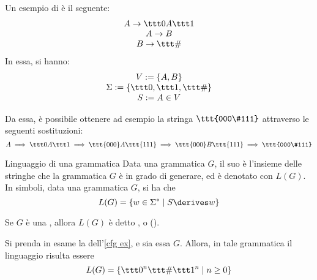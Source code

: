 \documentclass[a4paper, 12pt]{report}
\begin{document}
    \begin{example}[\CFG]
        \label{cfg ex}
        Un esempio di \CFG è il seguente: $$\left . \begin{array}{c} A \to \ttt 0 A \ttt 1 \\ A \to B \\ B \to \ttt \# \end{array} \right .$$ In essa, si hanno: $$\left . \begin{array}{c} V := \{A, B\} \\ \Sigma := \{\ttt 0, \ttt 1, \ttt \# \} \\ S := A \in V \end{array} \right. $$

        Da essa, è possibile ottenere ad esempio la stringa $\ttt{000\#111}$ attraverso le seguenti sostituzioni: $$A \implies \ttt 0 A \ttt 1 \implies \ttt{000}A\ttt{111} \implies \ttt{000}B\ttt{111} \implies \ttt{000\#111}$$
    \end{example}

    \begin{frameddefn}{Linguaggio di una grammatica}
        Data una grammatica $G$, il suo  è l'insieme delle stringhe che la grammatica $G$ è in grado di generare, ed è denotato con $L(G)$. In simboli, data una grammatica $G$, si ha che $$L(G) = \{w \in \Sigma ^* \mid S \derives w\}$$
    \end{frameddefn}

    \begin{frameddefn}{\CFL}
        Se $G$ è una \CFG, allora $L(G)$ è detto , o \CFL ().
    \end{frameddefn}

    \begin{example}[\CFL]
        Si prenda in esame la \CFG dell'\cref{cfg ex}, e sia essa $G$. Allora, in tale grammatica il linguaggio risulta essere $$L(G) = \{\ttt 0 ^n \ttt \# \ttt 1 ^n \mid n \ge 0\}$$
    \end{example}
\end{document}
